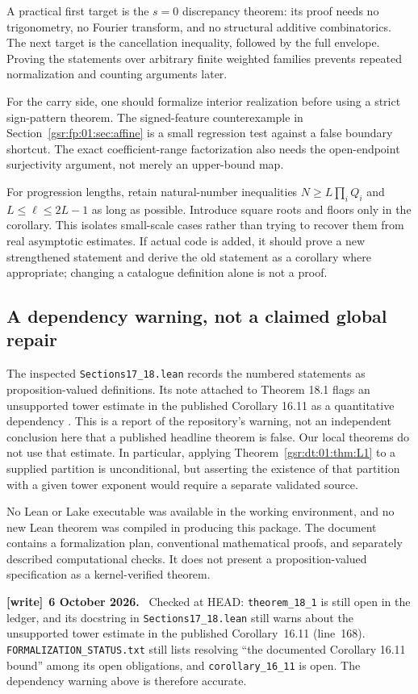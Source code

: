 \documentclass[11pt,letterpaper]{article}
\numberwithin{equation}{section}
\theoremstyle{definition}
\theoremstyle{remark}
\newcommand{\1}{\mathbf 1}
\newcommand{\code}[1]{\texttt{\small #1}}
\newcommand{\file}[1]{\nolinkurl{#1}}
\newenvironment{writenote}[1][]{\par\smallskip\begingroup\small
 \noindent\textbf{[write]}\if\relax\detokenize{#1}\relax\else~\textbf{#1.}\fi\ }%
 {\par\endgroup\smallskip}
\begin{document}
A practical first target is the $s=0$ discrepancy theorem:
its proof needs no trigonometry, no Fourier transform, and no structural
additive combinatorics. The next target is the cancellation inequality,
followed by the full envelope. Proving the statements over arbitrary
finite weighted families prevents repeated normalization and counting
arguments later.

For the carry side, one should formalize interior realization before using
a strict sign-pattern theorem. The signed-feature counterexample in
Section~\ref{gsr:fp:01:sec:affine} is a small regression test against a false
boundary shortcut. The exact coefficient-range factorization also needs
the open-endpoint surjectivity argument, not merely an upper-bound map.

For progression lengths, retain natural-number inequalities
$N\ge L\prod_iQ_i$ and $L\le\ell\le2L-1$ as long as possible.
Introduce square roots and floors only in the corollary. This isolates
small-scale cases rather than trying to recover them from real asymptotic
estimates. If actual code is added, it should prove a new strengthened
statement and derive the old statement as a corollary where appropriate;
changing a catalogue definition alone is not a proof.

\subsection{A dependency warning, not a claimed global repair}
The inspected \code{Sections17\_18.lean} records the numbered statements
as proposition-valued definitions. Its note attached to Theorem 18.1 flags
an unsupported tower estimate in the published Corollary 16.11 as a
quantitative dependency \cite{repo01sections}. This is a report of the
repository's warning, not an independent conclusion here that a published
headline theorem is false. Our local theorems do not use that estimate.
In particular, applying Theorem~\ref{gsr:dt:01:thm:L1} to a supplied partition is
unconditional, but asserting the existence of that partition with a given
tower exponent would require a separate validated source.

No Lean or Lake executable was available in the working environment, and
no new Lean theorem was compiled in producing this package. The document
contains a formalization plan, conventional mathematical proofs, and
separately described computational checks. It does not present a
proposition-valued specification as a kernel-verified theorem.
\begin{writenote}[6 October 2026]
Checked at HEAD: \file{theorem_18_1} is still open in the ledger, and its docstring in \file{Sections17\_18.lean} still warns about the unsupported tower estimate in the published Corollary~16.11 (line~168). \file{FORMALIZATION\_STATUS.txt} still lists resolving ``the documented Corollary 16.11 bound'' among its open obligations, and \file{corollary_16_11} is open. The dependency warning above is therefore accurate.
\end{writenote}
\end{document}
